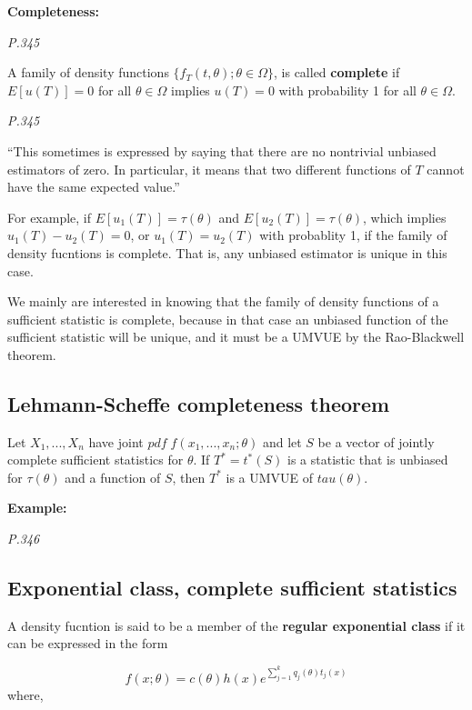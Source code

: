 \documentclass[]{book}
\begin{document}
\textbf{Completeness:}

\emph{P.345}

A family of density functions \(\{ f_T(t,\theta); \theta \in \Omega\}\), is called \textbf{complete} if \(E[u(T)]=0\) for all \(\theta \in \Omega\) implies \(u(T)=0\) with probability 1 for all \(\theta \in \Omega\).

\emph{P.345}

``This sometimes is expressed by saying that there are no nontrivial unbiased estimators of zero. In particular, it means that two different functions of \(T\) cannot have the same expected value.''

For example, if \(E[u_1(T)]=\tau(\theta)\) and \(E[u_2(T)]=\tau(\theta)\), which implies \(u_1(T)-u_2(T)=0\), or \(u_1(T)=u_2(T)\) with probablity 1, if the family of density fucntions is complete. That is, any unbiased estimator is unique in this case.

We mainly are interested in knowing that the family of density functions of a sufficient statistic is complete, because in that case an unbiased function of the sufficient statistic will be unique, and it must be a UMVUE by the Rao-Blackwell theorem.

\hypertarget{lehmann-scheffe-completeness-theorem}{%
\subsection{Lehmann-Scheffe completeness theorem}\label{lehmann-scheffe-completeness-theorem}}

Let \(X_1,...,X_n\) have joint \(pdf \; f(x_1,...,x_n; \theta)\) and let \(S\) be a vector of jointly complete sufficient statistics for \(\theta\). If \(T^*=t^*(S)\) is a statistic that is unbiased for \(\tau(\theta)\) and a function of \(S\), then \(T^*\) is a UMVUE of \(tau(\theta)\).

\textbf{Example:}

\emph{P.346}

\hypertarget{exponential-class-complete-sufficient-statistics}{%
\subsection{Exponential class, complete sufficient statistics}\label{exponential-class-complete-sufficient-statistics}}

A density fucntion is said to be a member of the \textbf{regular exponential class} if it can be expressed in the form

\[f(x; \theta)=c(\theta)h(x)e^{\sum_{j=1}^k q_j(\theta)t_j(x)}\]
where,
\end{document}
